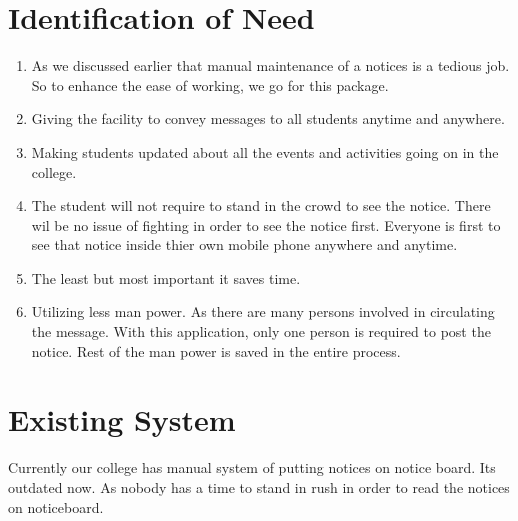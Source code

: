 \pagebreak
\section{Identification of Need}
\begin{enumerate}
\item As we discussed earlier that manual maintenance of a notices is a tedious
job. So to enhance the ease of working, we go for this package.

\item Giving  the facility to convey messages to all students anytime and anywhere.

\item Making students updated about all the events and activities going on in the college.

\item The student will not require to stand in the crowd to see the notice.
There wil be no issue of fighting in order to see the notice first. Everyone is first to see that notice inside thier own mobile phone 
anywhere and anytime.
\item The least but most important it saves time.

\item Utilizing less man power. As there are many persons involved in circulating the message. With this application, only one person is required to post the notice. Rest of the man power is saved in the entire process.

\end{enumerate}

\pagebreak
\section{Existing System}
Currently our college has manual system of putting notices on notice board. Its outdated now.
As nobody has a time to stand in rush in order to read the notices on noticeboard.

